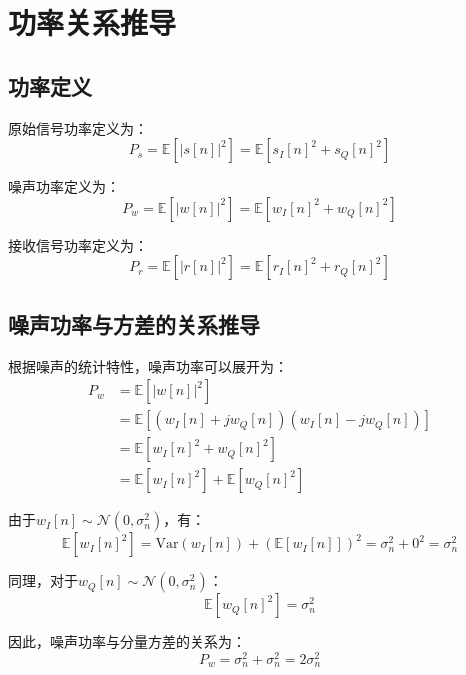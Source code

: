 \documentclass[12pt]{article}
\begin{document}
\section{功率关系推导}

\subsection{功率定义}

原始信号功率定义为：
\begin{equation}
P_s = \mathbb{E}[|s[n]|^2] = \mathbb{E}[s_I[n]^2 + s_Q[n]^2]
\end{equation}

噪声功率定义为：
\begin{equation}
P_w = \mathbb{E}[|w[n]|^2] = \mathbb{E}[w_I[n]^2 + w_Q[n]^2]
\end{equation}

接收信号功率定义为：
\begin{equation}
P_r = \mathbb{E}[|r[n]|^2] = \mathbb{E}[r_I[n]^2 + r_Q[n]^2]
\end{equation}

\subsection{噪声功率与方差的关系推导}

根据噪声的统计特性，噪声功率可以展开为：
\begin{align}
P_w &= \mathbb{E}[|w[n]|^2] \\
&= \mathbb{E}[(w_I[n] + jw_Q[n])(w_I[n] - jw_Q[n])] \\
&= \mathbb{E}[w_I[n]^2 + w_Q[n]^2] \\
&= \mathbb{E}[w_I[n]^2] + \mathbb{E}[w_Q[n]^2]
\end{align}

由于$w_I[n] \sim \mathcal{N}(0, \sigma_n^2)$，有：
\begin{equation}
\mathbb{E}[w_I[n]^2] = \text{Var}(w_I[n]) + (\mathbb{E}[w_I[n]])^2 = \sigma_n^2 + 0^2 = \sigma_n^2
\end{equation}

同理，对于$w_Q[n] \sim \mathcal{N}(0, \sigma_n^2)$：
\begin{equation}
\mathbb{E}[w_Q[n]^2] = \sigma_n^2
\end{equation}

因此，噪声功率与分量方差的关系为：
\begin{equation}
P_w = \sigma_n^2 + \sigma_n^2 = 2\sigma_n^2
\end{equation}
\end{document}

